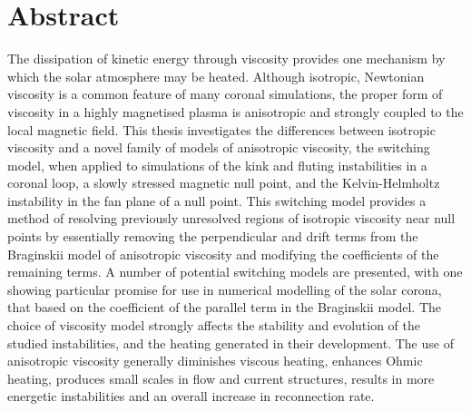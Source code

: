 \chapter{Abstract}

The dissipation of kinetic energy through viscosity provides one mechanism by which the solar atmosphere may be heated. Although isotropic, Newtonian viscosity is a common feature of many coronal simulations, the proper form of viscosity in a highly magnetised plasma is anisotropic and strongly coupled to the local magnetic field. This thesis investigates the differences between isotropic viscosity and a novel family of models of anisotropic viscosity, the switching model, when applied to simulations of the kink and fluting instabilities in a coronal loop, a slowly stressed magnetic null point, and the Kelvin-Helmholtz instability in the fan plane of a null point. This switching model provides a method of resolving previously unresolved regions of isotropic viscosity near null points by essentially removing the perpendicular and drift terms from the Braginskii model of anisotropic viscosity and modifying the coefficients of the remaining terms. A number of potential switching models are presented, with one showing particular promise for use in numerical modelling of the solar corona, that based on the coefficient of the parallel term in the Braginskii model. The choice of viscosity model strongly affects the stability and evolution of the studied instabilities, and the heating generated in their development. The use of anisotropic viscosity generally diminishes viscous heating, enhances Ohmic heating, produces small scales in flow and current structures, results in more energetic instabilities and an overall increase in reconnection rate.
